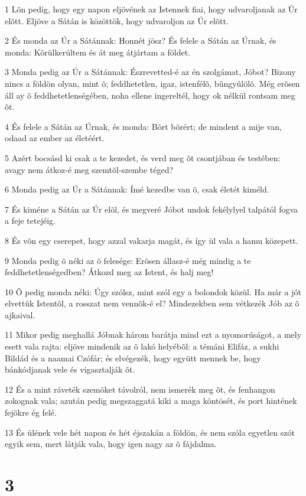 \par 1 Lõn pedig, hogy egy napon eljövének az Istennek fiai, hogy udvaroljanak az Úr elõtt. Eljöve a Sátán is közöttök, hogy udvaroljon az Úr elõtt.
\par 2 És monda az Úr a Sátánnak: Honnét jösz? És felele a Sátán az Úrnak, és monda: Körülkerültem és át meg átjártam a földet.
\par 3 Monda pedig az Úr a Sátánnak: Észrevetted-é az én szolgámat, Jóbot? Bizony nincs a földön olyan, mint õ; feddhetetlen, igaz, istenfélõ, bûngyûlölõ. Még erõsen áll ay õ feddhetetlenségében, noha ellene ingereltél, hogy ok nélkül rontsam meg õt.
\par 4 És felele a Sátán az Úrnak, és monda: Bõrt bõrért; de mindent a mije van, odaad az ember az életéért.
\par 5 Azért bocsásd ki csak a te kezedet, és verd meg õt csontjában és testében: avagy nem átkoz-é meg szemtõl-szembe téged?
\par 6 Monda pedig az Úr a Sátánnak: Ímé kezedbe van õ, csak életét kiméld.
\par 7 És kiméne a Sátán az Úr elõl, és megveré Jóbot undok fekélylyel talpától fogva a feje tetejéig.
\par 8 És võn egy cserepet, hogy azzal vakarja magát, és így ül vala a hamu közepett.
\par 9 Monda pedig õ néki az õ felesége: Erõsen állasz-é még mindig a te feddhetetlenségedben? Átkozd meg az Istent, és halj meg!
\par 10 Õ pedig monda néki: Úgy szólsz, mint szól egy a bolondok közül. Ha már a jót elvettük Istentõl, a rosszat nem vennõk-é el? Mindezekben sem vétkezék Jób az õ ajkaival.
\par 11 Mikor pedig meghallá Jóbnak három barátja mind ezt a nyomorúságot, a mely esett vala rajta: eljöve mindenik az õ lakó helyébõl: a témáni Elifáz, a sukhi Bildád és a naamai Czófár; és elvégezék, hogy együtt mennek be, hogy bánkódjanak vele és vigasztalják õt.
\par 12 És a mint ráveték szemöket távolról, nem ismerék meg õt, és fenhangon zokognak vala; azután pedig megszaggatá kiki a maga köntösét, és port hintének fejökre ég felé.
\par 13 És ülének vele hét napon és hét éjszakán a földön, és nem szóla egyetlen szót egyik sem, mert látják vala, hogy igen nagy az õ fájdalma.

\chapter{3}


